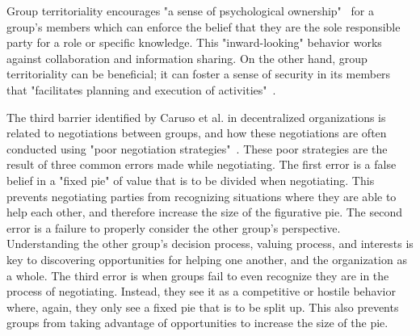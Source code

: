 Group territoriality encourages "a sense of psychological ownership"~\cite{caruso2008boundaries} for a group's members which can enforce the belief that they are the sole responsible party for a role or specific knowledge. This "inward-looking" behavior works against collaboration and information sharing. On the other hand, group territoriality can be beneficial; it can foster a sense of security in its members that "facilitates planning and execution of activities"~\cite{caruso2008boundaries}. 

The third barrier identified by Caruso et al. in decentralized organizations is related to negotiations between groups, and how these negotiations are often conducted using "poor negotiation  strategies"~\cite{caruso2008boundaries}. These poor strategies are the result of three common errors made while negotiating. The first error is a false belief in a "fixed pie" of value that is to be divided when negotiating. This prevents negotiating parties from recognizing situations where they are able to help each other, and therefore increase the size of the figurative pie. The second error is a failure to properly consider the other group's perspective. Understanding the other group's decision process, valuing process, and interests is key to discovering opportunities for helping one another, and the organization as a whole. The third error is when groups fail to even recognize they are in the process of negotiating. Instead, they see it as a competitive or hostile behavior where, again, they only see a fixed pie that is to be split up. This also prevents groups from taking advantage of opportunities to increase the size of the pie.    


%
%
%


